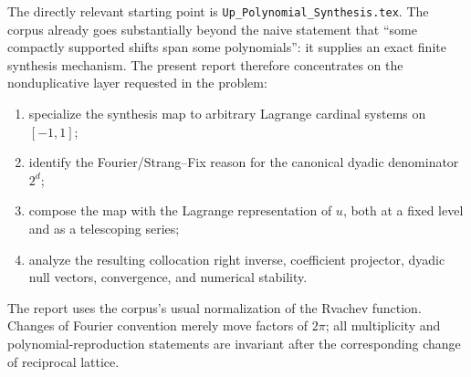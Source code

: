 \documentclass[11pt,oneside]{book}
\theoremstyle{definition}
\theoremstyle{remark}
\newcommand{\RepoPath}[1]{\texttt{#1}}
\begin{document}
The directly relevant starting point is \RepoPath{Up\_Polynomial\_Synthesis.tex}.  The corpus already goes substantially beyond the naive statement that ``some compactly supported shifts span some polynomials'': it supplies an exact finite synthesis mechanism.  The present report therefore concentrates on the nonduplicative layer requested in the problem:
\begin{enumerate}
  \item specialize the synthesis map to arbitrary Lagrange cardinal systems on \([-1,1]\);
  \item identify the Fourier/Strang--Fix reason for the canonical dyadic denominator \(2^d\);
  \item compose the map with the Lagrange representation of \(u\), both at a fixed level and as a telescoping series;
  \item analyze the resulting collocation right inverse, coefficient projector, dyadic null vectors, convergence, and numerical stability.
\end{enumerate}

The report uses the corpus's usual normalization of the Rvachev function.  Changes of Fourier convention merely move factors of \(2\pi\); all multiplicity and polynomial-reproduction statements are invariant after the corresponding change of reciprocal lattice.

\end{document}
